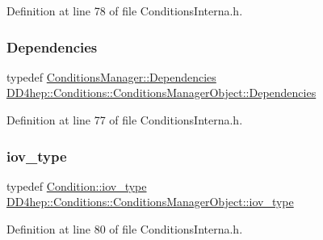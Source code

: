 Definition at line 78 of file Conditions\+Interna.\+h.

\hypertarget{class_d_d4hep_1_1_conditions_1_1_conditions_manager_object_a539905074db3aee8b401d575649dbdd8}{}\label{class_d_d4hep_1_1_conditions_1_1_conditions_manager_object_a539905074db3aee8b401d575649dbdd8} 
\subsubsection{\texorpdfstring{Dependencies}{Dependencies}}
{\footnotesize\ttfamily typedef \hyperlink{class_d_d4hep_1_1_conditions_1_1_conditions_manager_aab778cfbe096ae8ad20a0bdbb047ad32}{Conditions\+Manager\+::\+Dependencies} \hyperlink{class_d_d4hep_1_1_conditions_1_1_conditions_manager_object_a539905074db3aee8b401d575649dbdd8}{D\+D4hep\+::\+Conditions\+::\+Conditions\+Manager\+Object\+::\+Dependencies}}



Definition at line 77 of file Conditions\+Interna.\+h.

\hypertarget{class_d_d4hep_1_1_conditions_1_1_conditions_manager_object_a0190ec510ca46da4a1cc908ac3c3a1dd}{}\label{class_d_d4hep_1_1_conditions_1_1_conditions_manager_object_a0190ec510ca46da4a1cc908ac3c3a1dd} 
\subsubsection{\texorpdfstring{iov\+\_\+type}{iov\_type}}
{\footnotesize\ttfamily typedef \hyperlink{class_d_d4hep_1_1_conditions_1_1_condition_ad84300e226b2085ec5e9db7f47be5539}{Condition\+::iov\+\_\+type} \hyperlink{class_d_d4hep_1_1_conditions_1_1_conditions_manager_object_a0190ec510ca46da4a1cc908ac3c3a1dd}{D\+D4hep\+::\+Conditions\+::\+Conditions\+Manager\+Object\+::iov\+\_\+type}}



Definition at line 80 of file Conditions\+Interna.\+h.

